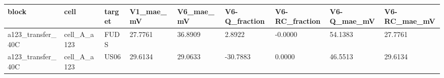 \begin{tabular}{lllllllll}
\hline
block & cell & target & V1\_mae\_mV & V6\_mae\_mV & V6-Q\_fraction & V6-RC\_fraction & V6-Q\_mae\_mV & V6-RC\_mae\_mV \\
\hline
a123\_transfer\_40C & cell\_A\_a123 & FUDS & 27.7761 & 36.8909 & 2.8922 & -0.0000 & 54.1383 & 27.7761 \\
a123\_transfer\_40C & cell\_A\_a123 & US06 & 29.6134 & 29.0633 & -30.7883 & 0.0000 & 46.5513 & 29.6134 \\
\hline
\end{tabular}
